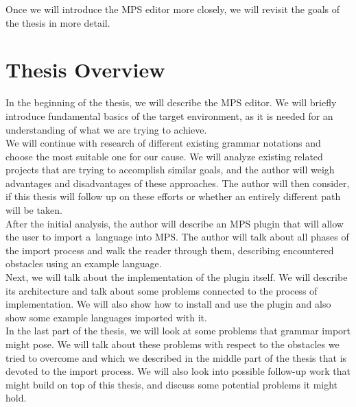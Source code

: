 Once we will introduce the MPS editor more closely, we will revisit the goals of the thesis in more detail.

\section{Thesis Overview}

In the beginning of the thesis, we will describe the MPS editor.
We will briefly introduce fundamental basics of the target environment, as it is needed for an understanding of what we are trying to achieve.
\\

We will continue with research of different existing grammar notations and choose the most suitable one for our cause.
We will analyze existing related projects that are trying to accomplish similar goals, and the author will weigh advantages and disadvantages of these approaches.
The author will then consider, if this thesis will follow up on these efforts or whether an entirely different path will be taken.
\\

After the initial analysis, the author will describe an MPS plugin that will allow the user to import a~language into MPS.
The author will talk about all phases of the import process and walk the reader through them, describing encountered obstacles using an example language.
\\

Next, we will talk about the implementation of the plugin itself.
We will describe its architecture and talk about some problems connected to the process of implementation.
We will also show how to install and use the plugin and also show some example languages imported with it.
\\

In the last part of the thesis, we will look at some problems that grammar import might pose.
We will talk about these problems with respect to the obstacles we tried to overcome and which we described in the middle part of the thesis that is devoted to the import process.
We will also look into possible follow-up work that might build on top of this thesis, and discuss some potential problems it might hold.
